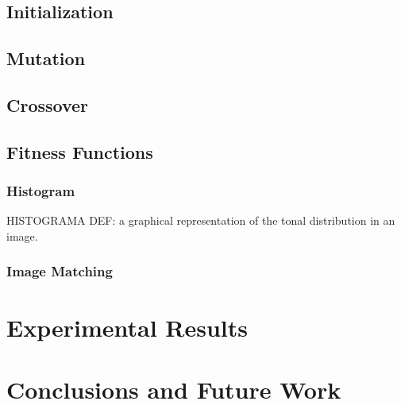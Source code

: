 \documentclass{llncs}
\begin{document}
\subsection{Initialization}\label{go:init}
\subsection{Mutation}\label{go:mutation}
\subsection{Crossover}\label{go:crossover}
\subsection{Fitness Functions}\label{go:fitness}
\subsubsection{Histogram}\label{go:fitness:hist}
HISTOGRAMA DEF: a graphical representation of the tonal distribution in an image.
\subsubsection{Image Matching}\label{go:fitness:image_match}

\section{Experimental Results} \label{exper}

\section{Conclusions and Future Work}\label{conclusions}




\end{document}
